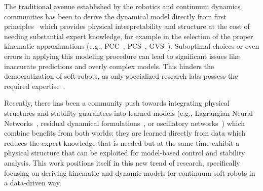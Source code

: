 The traditional avenue established by the robotics and continuum dynamics communities has been to derive the dynamical model directly from first principles~\citep{renda2018discrete, gazzola2018forward, grazioso2019geometrically, boyer2020dynamics, della2023model, armanini2023soft} 
which provides physical interpretability and structure at the cost of needing substantial expert knowledge, for example in the selection of the proper kinematic approximations (e.g., \gls{PCC}~\citep{webster2010design}, \gls{PCS}~\citep{renda2018discrete}, \gls{GVS}~\citep{boyer2020dynamics}). %
%
Suboptimal choices or even errors in applying this modeling procedure can lead to significant issues like inaccurate predictions and overly complex models. This hinders the democratization of soft robots, as only specialized research labs possess the required expertise~\citep{aracri2024soft}.

Recently, there has been a community push towards integrating physical structures and stability guarantees into learned models (e.g., Lagrangian Neural Networks~\citep{liu2024physics}, residual dynamical formulations~\citep{bruder2024koopman, gao2024sim}, or oscillatory networks~\citep{stolzle2024input}) which combine benefits from both worlds: they are learned directly from data which reduces the expert knowledge that is needed but at the same time exhibit a physical structure that can be exploited for model-based control and stability analysis.
This work positions itself in this new trend of research, specifically focusing on deriving kinematic and dynamic models for continuum soft robots in a data-driven way.
%
%


